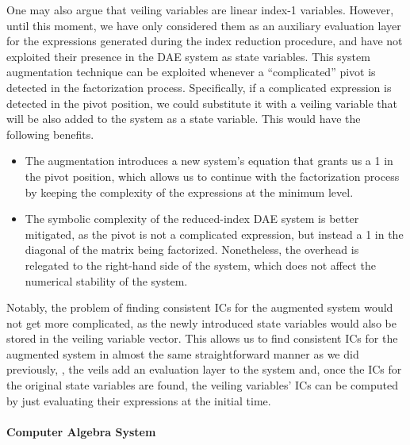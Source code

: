 One may also argue that veiling variables are linear index-1 variables. However, until this moment, we have only considered them as an auxiliary evaluation layer for the expressions generated during the index reduction procedure, and have not exploited their presence in the \ac{DAE} system as state variables. This system augmentation technique can be exploited whenever a ``complicated'' pivot is detected in the factorization process. Specifically, if a complicated expression is detected in the pivot position, we could substitute it with a veiling variable that will be also added to the system as a state variable. This would have the following benefits.
%
\begin{itemize}
  \setlength{\itemsep}{0.0em}
  \item The augmentation introduces a new system's equation that grants us a 1 in the pivot position, which allows us to continue with the factorization process by keeping the complexity of the expressions at the minimum level.
  \item The symbolic complexity of the reduced-index \ac{DAE} system is better mitigated, as the pivot is not a complicated expression, but instead a 1 in the diagonal of the matrix being factorized. Nonetheless, the overhead is relegated to the right-hand side of the system, which does not affect the numerical stability of the system.
\end{itemize}

Notably, the problem of finding consistent \acp{IC} for the augmented system would not get more complicated, as the newly introduced state variables would also be stored in the veiling variable vector. This allows us to find consistent \acp{IC} for the augmented system in almost the same straightforward manner as we did previously, \ie{}, the veils add an evaluation layer to the system and, once the \acp{IC} for the original state variables are found, the veiling variables' \acp{IC} can be computed by just evaluating their expressions at the initial time.

\paragraph{Computer Algebra System}


